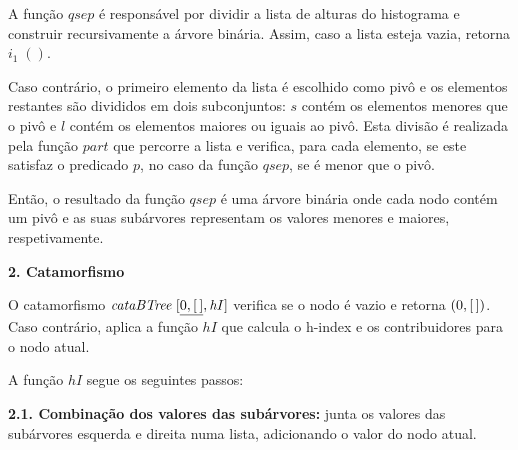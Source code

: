 \documentclass[11pt, a4paper, fleqn]{article}
\newcommand{\Varid}[1]{\mathit{#1}}
\begin{document}
A função \ensuremath{\Varid{qsep}} é responsável por dividir a lista de alturas do histograma e construir recursivamente a árvore binária.
Assim, caso a lista esteja vazia, retorna \ensuremath{i_1\;()}.

Caso contrário, o primeiro elemento da lista é escolhido como pivô e os elementos restantes são divididos em dois subconjuntos: \ensuremath{\Varid{s}} contém os elementos menores que o pivô e \ensuremath{\Varid{l}} contém os elementos maiores ou iguais ao pivô.
Esta divisão é realizada pela função \ensuremath{\Varid{part}} que percorre a lista e verifica, para cada elemento, se este satisfaz o predicado \ensuremath{\Varid{p}}, no caso da função \ensuremath{\Varid{qsep}}, se é menor que o pivô.

Então, o resultado da função \ensuremath{\Varid{qsep}} é uma árvore binária onde cada nodo contém um pivô e as suas subárvores representam os valores menores e maiores, respetivamente.

\textbf{2. Catamorfismo}

O catamorfismo \ensuremath{\Varid{cataBTree}\;\alt{\underline{\mathrm{0},[\mskip1.5mu \mskip1.5mu]}}{\Varid{hI}}} verifica se o nodo é vazio e retorna \ensuremath{(\mathrm{0},[\mskip1.5mu \mskip1.5mu])}.
Caso contrário, aplica a função \ensuremath{\Varid{hI}} que calcula o h-index e os contribuidores para o nodo atual.

A função \ensuremath{\Varid{hI}} segue os seguintes passos:

\textbf{2.1. Combinação dos valores das subárvores:} junta os valores das subárvores esquerda e direita numa lista, adicionando o valor do nodo atual.
\end{document}
